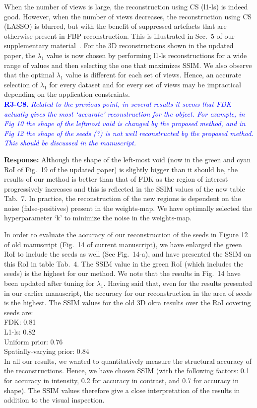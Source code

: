 \documentclass{article}
\begin{document}
When the number of views is large, the reconstruction using CS (l1-ls) is indeed good. However, when the number of views decreases, the reconstruction using CS (LASSO) is blurred, but with the benefit of suppressed artefacts that are otherwise present in FBP reconstruction. This is illustrated in Sec.~5 of our supplementary material~\cite{supp_paper}.      
For the 3D reconstructions shown in the updated paper, the $\lambda_1$ value is now chosen by performing l1-ls reconstructions for a wide range of values and then selecting the one that maximizes SSIM.
We also observe that the optimal $\lambda_1$ value is different for each set of views. Hence, an accurate selection of $\lambda_1$ for every dataset and for every set of views may be impractical depending on the application constraints.\\

\textcolor{blue}{\textbf{R3-C8.}\textit{ Related to the previous point, in several results it seems that FDK actually gives the most `accurate' reconstruction for the object. For example, in Fig 10 the shape of the leftmost void is changed by the proposed method, and in Fig 12 the shape of the seeds (?) is not well reconstructed by the proposed method. This should be discussed in the manuscript.}}
    
\textbf{Response:}  Although the shape of the left-most void (now in the green and cyan RoI of Fig.~19 of the updated paper) is slightly bigger than it should be, the results of our method is better than that of FDK as the region of interest progressively increases and this is reflected in the SSIM values of the new table Tab.~7. In practice, the reconstruction of the new regions is dependent on the noise (false-positives) present in the weights-map.  We have optimally selected the hyperparameter `k' to minimize the noise in the weights-map.

In order to evaluate the accuracy of our reconstruction of the seeds in Figure 12 of old manuscript (Fig.~14 of current manuscript), we have enlarged the green RoI to include the seeds as well (See Fig.~14-a), and have presented the SSIM on this RoI in table Tab.~4. The SSIM value in the green RoI (which includes the seeds) is the highest for our method. We note that the results in Fig.~14 have been updated after tuning for $\lambda_1$. Having said that, even for the results presented in our earlier manuscript, the accuracy for our reconstruction in the area of seeds is the highest.
The SSIM values for the old 3D okra results over the RoI covering seeds are:\\
FDK: 0.81\\
L1-ls: 0.82\\
Uniform prior: 0.76\\
Spatially-varying prior: 0.84 \\
In all our results, we wanted to quantitatively measure the structural accuracy of the reconstructions. Hence, we have chosen SSIM (with the following factors: 0.1 for accuracy in intensity, 0.2 for accuracy in contrast, and 0.7 for accuracy in shape). The SSIM values therefore give a close interpretation of the results in addition to the visual inspection. \\
\end{document}
